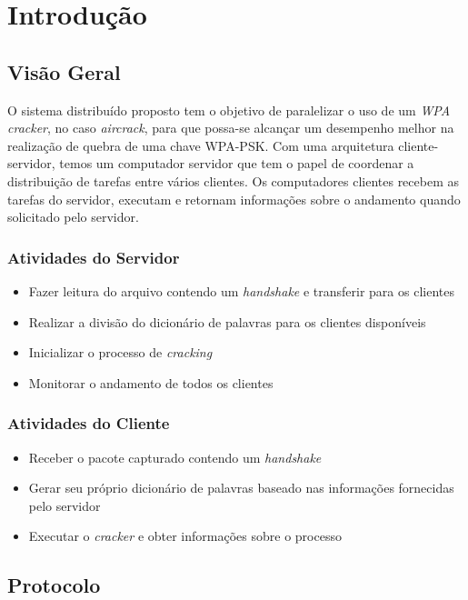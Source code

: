 \documentclass[12pt,a4paper]{abnt}
\begin{document}
\chapter{Introdução}
	\section{Visão Geral}
		O sistema distribuído proposto tem o objetivo de paralelizar o uso de um \emph{WPA cracker}, no caso \emph{aircrack}, para que possa-se alcançar um desempenho melhor na realização de quebra de uma chave WPA-PSK. Com uma arquitetura cliente-servidor, 
		temos um computador servidor que tem o papel de coordenar a distribuição de tarefas entre vários clientes. Os computadores clientes recebem as tarefas do servidor, executam e retornam informações sobre o andamento quando solicitado pelo servidor.
		
		\subsection{Atividades do Servidor}
		\begin{itemize}
			\item Fazer leitura do arquivo contendo um \emph{handshake} e transferir para os clientes 
			\item Realizar a divisão do dicionário de palavras para os clientes disponíveis
			\item Inicializar o processo de \emph{cracking}
			\item Monitorar o andamento de todos os clientes
		\end{itemize}
		
		\subsection{Atividades do Cliente}
		\begin{itemize}
			\item Receber o pacote capturado contendo um \emph{handshake}
			\item Gerar seu próprio dicionário de palavras baseado nas informações fornecidas pelo servidor
			\item Executar o \emph{cracker} e obter informações sobre o processo
		\end{itemize}

	\clearpage
	\section{Protocolo}
\end{document}
